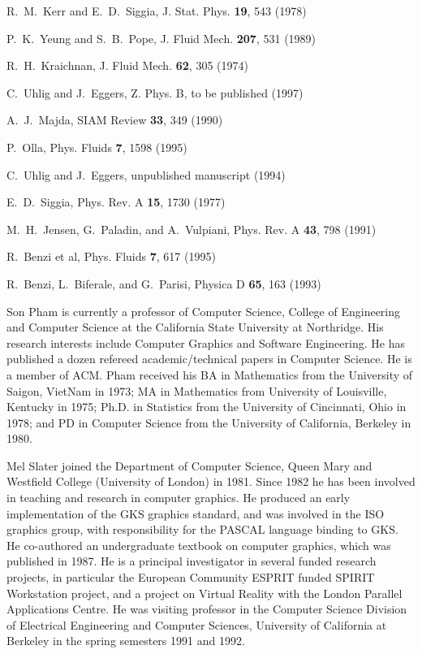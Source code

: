 \documentclass[dc]{svjour}
\begin{document}
\begin{thebibliography}{47}
 R.~M.~Kerr and E.~D.~Siggia,  J. Stat. Phys. {\bf 19}, 543 (1978)

 P.~K.~Yeung and S.~B.~Pope,
J. Fluid Mech. {\bf 207}, 531 (1989)

 R.~H.~Kraichnan,  J. Fluid Mech. {\bf 62}, 305 (1974)

 C.~Uhlig and J.~Eggers,  Z. Phys. B, to be published
                  (1997)

 A.~J.~Majda,  SIAM Review {\bf 33}, 349 (1990)

 P.~Olla,
Phys. Fluids {\bf 7}, 1598 (1995)

 C.~Uhlig and J.~Eggers,  {unpublished
                  manuscript} (1994)

 E.~D.~Siggia,  Phys. Rev. A {\bf 15}, 1730 (1977)


 M.~H.~Jensen, G.~Paladin, and A.~Vulpiani,
Phys. Rev. A  {\bf 43}, 798 (1991)

 R.~Benzi et al,  Phys. Fluids {\bf 7}, 617 (1995)

 R.~Benzi, L.~Biferale, and G.~Parisi, Physica D {\bf 65}, 163 (1993)

\end{thebibliography}
\vspace*{4mm}
\begin{biography}
{Son Pham}
is currently a professor of Computer
Science, College of Engineering and Computer Science at the California
State University at Northridge. His research interests include Computer
Graphics and Software Engineering. He has published a dozen refereed
academic/technical papers in Computer Science. He is a member of ACM.
Pham received his BA in Mathematics from the University of Saigon,
VietNam in 1973; MA in Mathematics from University of Louisville,
Kentucky in 1975; Ph.D. in Statistics from the University of Cincinnati,
Ohio in 1978; and PD in Computer Science from the University of
California, Berkeley in 1980.
\end{biography}
\newpage
\begin{biography}
{Mel Slater}
joined the Department of Computer Science,
Queen Mary and Westfield College (University of London) in 1981. Since
1982 he has been involved in teaching and research in computer graphics.
He produced an early implementation of the GKS graphics standard, and
was involved in the ISO graphics group, with responsibility for the
PASCAL language binding to GKS. He co-authored an undergraduate textbook
on computer graphics, which was published in 1987. He is a principal
investigator in several funded research projects, in particular the
European Community ESPRIT funded SPIRIT Workstation project, and a
project on Virtual Reality with the London Parallel Applications Centre.
He was visiting professor in the Computer Science Division of Electrical
Engineering and Computer Sciences, University of California at Berkeley
in the spring semesters 1991 and 1992.
\end{biography}
\end{document}
